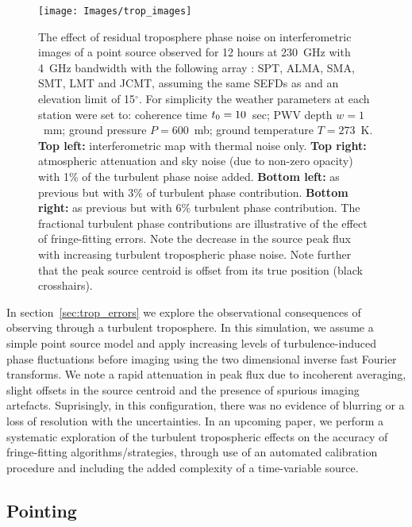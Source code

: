 {%
\begin{figure}
\begin{center}
\texttt{[image: Images/trop\_images]}
\caption{The effect of residual troposphere phase noise on interferometric images of a point source observed for 12 hours at 230~GHz with 4~GHz bandwidth with the following array : SPT, ALMA, SMA, SMT, LMT and JCMT, assuming the same SEFDs as \protect\citet{Lu_2014} and an elevation limit of 15$^\circ$. For simplicity the weather parameters at each station were set to: coherence time $t_{\rm 0}=10$~sec; PWV depth $w=1$~mm; ground pressure $P=600$~mb; ground temperature $T =273$~K. {\bf Top left:} interferometric map with thermal noise only. {\bf Top right:} atmospheric attenuation and sky noise (due to non-zero opacity) with 1\% of the turbulent phase noise added. {\bf Bottom left:} as previous but with 3\% of turbulent phase contribution. {\bf Bottom right:} as previous but with 6\% turbulent phase contribution. The fractional turbulent phase contributions are illustrative of the effect of fringe-fitting errors. Note the decrease in the source peak flux with increasing turbulent tropospheric phase noise. Note further that the peak source centroid is offset from its true position (black crosshairs). \label{fig:trop_images}%
}
\end{center}
\end{figure}


In section~\ref{sec:trop_errors} we explore the observational consequences of observing through a turbulent troposphere. In this simulation, we assume a simple point source model and apply increasing levels of turbulence-induced phase fluctuations before imaging using the two dimensional inverse fast Fourier transforms. We note a rapid attenuation in peak flux due to incoherent averaging, slight offsets in the source centroid and the presence of spurious imaging artefacts. Suprisingly, in this configuration, there was no evidence of blurring or a loss of resolution with the uncertainties. In an upcoming paper, we perform a systematic exploration of the turbulent tropospheric effects on the accuracy of fringe-fitting algorithms/strategies, through use of an automated calibration procedure and including the added complexity of a time-variable source. 



\subsection{Pointing}

}
